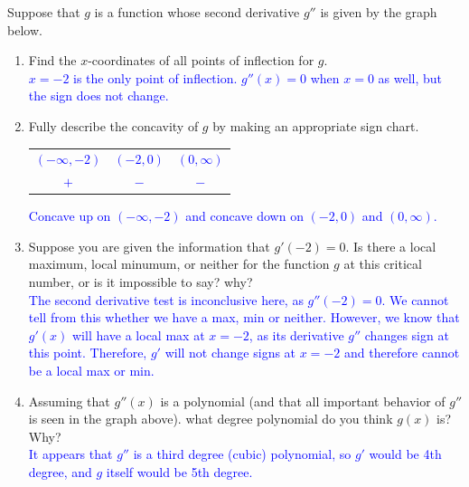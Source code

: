 \documentclass{ximera}
\begin{document}
\begin{exercise}
    Suppose that $g$ is a function whose second derivative $g''$ is given by the graph below. 
    \begin{image}
    \end{image}
    \begin{enumerate}
         \item Find the $x$-coordinates of all points of inflection for $g$.\\
         \textcolor{blue}{$x=-2$ is the only point of inflection.  $g''(x)=0$ when $x=0$ as well, but the sign does not change.} 
    \item Fully describe the concavity of $g$ by making an appropriate sign chart.\\
      \textcolor{blue}{\begin{tabular}{c|c|c}
        $(-\infty,-2)$ & $(-2,0)$ & $(0,\infty)$\\
        $+$ & $-$ & $-$
      \end{tabular}
      Concave up on $(-\infty,-2)$ and concave down on $(-2,0)$ and $(0,\infty)$.
      }
    \item Suppose you are given the information that $g'(-2)=0$.  Is there a local maximum, local minumum, or neither for the function $g$ at this critical number, or is it impossible to say?  why?\\
    \textcolor{blue}{The second derivative test is inconclusive here, as $g''(-2)=0$.  We cannot tell from this whether we have a max, min or neither.  However, we know that $g'(x)$ will have a local max at $x=-2$, as its derivative $g''$ changes sign at this point.  Therefore, $g'$ will not change signs at $x=-2$ and therefore cannot be a local max or min.}
    \item Assuming that $g''(x)$ is a polynomial (and that all important behavior of $g''$ is seen in the graph above). what degree polynomial do you think $g(x)$ is?  Why?\\
    \textcolor{blue}{It appears that $g''$ is a third degree (cubic) polynomial, so $g'$ would be 4th degree, and $g$ itself would be 5th degree.}
    \end{enumerate}
   
\end{exercise}
\end{document}
